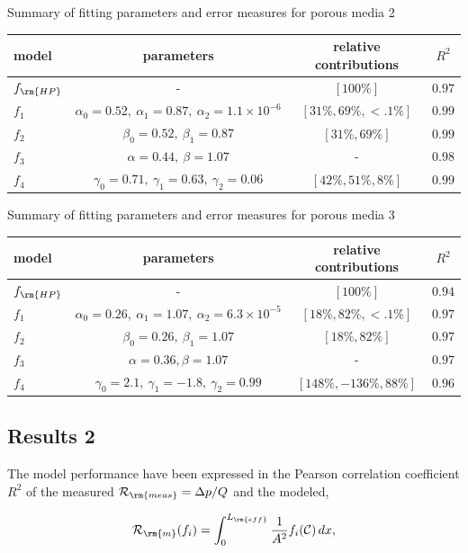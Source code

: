 \documentclass[draft,jgrga]{agutexSI2019}
\begin{document}
\begin{article}
Summary of fitting parameters and error measures for porous media 2\\
\begin{tabular}{l|c|c|c}
\hline
model & parameters  & relative contributions & $R^2$  \\
\hline
$f_{\rm{HP}}$&-  									& $[100\%]$ &  $0.97$  \\
$f_1$		&$\alpha_0 = 0.52,~\alpha_1 = 0.87,~\alpha_2 = 1.1\times 10^{-6} $ 	& $[31\%,69\%,<.1\%]$ & $0.99$ \\
$f_2$ 		&$\beta_0 = 0.52,~\beta_1 = 0.87 $				&  $[31\%,69\%]$ & $0.99$\\
$f_3$ 		&$\alpha = 0.44,~\beta = 1.07 $					& -  & $0.98$\\
$f_4$ 		&$\gamma_0 = 0.71,~\gamma_1 = 0.63,~\gamma_2 = 0.06 $ & $[42\%,51\%,8\%]$ & $0.99$\\
\end{tabular}

\vspace{1cm}


Summary of fitting parameters and error measures for porous media 3\\
\begin{tabular}{l|c|c|c}
\hline
model & parameters  & relative contributions & $R^2$  \\
\hline
$f_{\rm{HP}}$&-  									& $[100\%]$ &  $0.94$  \\
$f_1$		&$\alpha_0 = 0.26,~\alpha_1 = 1.07,~\alpha_2 = 6.3\times 10^{-5} $ 	& $[18\%,82\%,<.1\%]$ & $0.97$ \\
$f_2$ 		&$\beta_0 = 0.26,~\beta_1 = 1.07 $				&  $[18\%,82\%]$ & $0.97$\\
$f_3$ 		&$\alpha = 0.36, \beta = 1.07 $					& -  & $0.97$\\
$f_4$ 		&$\gamma_0 = 2.1,~\gamma_1 = -1.8,~\gamma_2 = 0.99 $ & $[148\%,-136\%,88\%]$ & $0.96$\\
\end{tabular}

 
\subsection{Results 2}

The model performance have been expressed in the Pearson correlation coefficient $R^2$ of the measured $\mathcal{R}_{\rm{meas}}= \Delta p/Q$ and the modeled,

\begin{equation}
	\mathcal{R}_{\rm{m}}(f_i) = \int^{L_{\rm{eff}}}_{0}\frac{1}{A^2}f_i(\mathcal{C})\,dx,
\end{equation}


\end{article}
\end{document}
